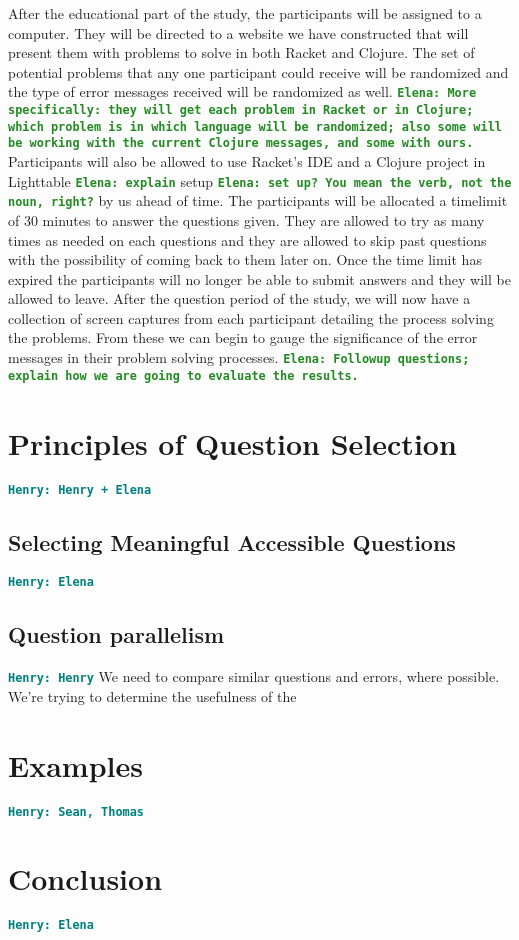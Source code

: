 \documentclass[12pt]{article}
\newcommand{\comment}[1]{{\bf \tt  {#1}}}
\newcommand{\emcomment}[1]{\textcolor{ForestGreen}{\comment{Elena: {#1}}}}
\newcommand{\hfcomment}[1]{\textcolor{Teal}{\comment{Henry: {#1}}}}
\begin{document}
	After the educational part of the study, the participants will be assigned to a computer. They will be directed to a website we have constructed that will present them with problems to solve in both Racket and Clojure. The set of potential problems that any one participant could receive will be randomized and the type of error messages received will be randomized as well. \emcomment{More specifically: they will get each problem in Racket or in Clojure; which problem is in which language will be randomized; also some will be working with the current Clojure messages, and some with ours.}
Participants will also be allowed to use Racket's IDE and a Clojure project in Lighttable \emcomment{explain}  setup \emcomment{set up? You mean the verb, not the noun, right?} by us ahead of time. The participants will be allocated a timelimit of 30 minutes to answer the questions given. They are allowed to try as many times as needed on each questions and they are allowed to skip past questions with the possibility of coming back to them later on. Once the time limit has expired the participants will no longer be able to submit answers and they will be allowed to leave. After the question period of the study, we will now have a collection of screen captures from each participant detailing the process solving the problems. From these we can begin to gauge the significance of the error messages in their problem solving processes. 
\emcomment{Followup questions; explain how we are going to evaluate the results.}


	
	

\section{Principles of Question Selection}\label{sec:select}
	\hfcomment{Henry + Elena}
	\subsection{Selecting Meaningful Accessible Questions}\label{sec:meaning}
	\hfcomment{Elena}
	\subsection{Question parallelism}\label{sec:parallel}
	\hfcomment{Henry}
	We need to compare similar questions and errors, where possible. We're trying to determine the usefulness of the 
\section{Examples}\label{sec:examples}
	\hfcomment{Sean, Thomas}

\section{Conclusion}\label{sec:conclusion}
	\hfcomment{Elena}




\end{document}
